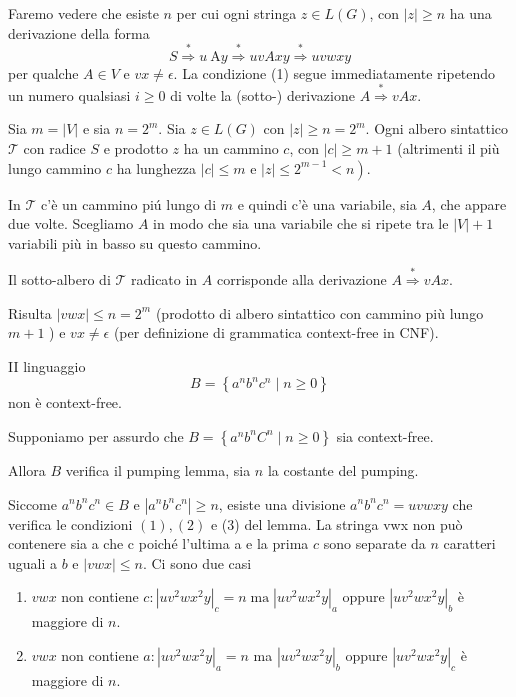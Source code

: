 Faremo vedere che esiste $n$ per cui ogni stringa $z \in L(G)$, con $|z| \geq n$ ha una derivazione della forma
$$
S \stackrel{*}{\Rightarrow} u \mathrm{~A} y \stackrel{*}{\Rightarrow} u v A x y \stackrel{*}{\Rightarrow} u v w x y
$$
per qualche $A \in V$ e $v x \neq \epsilon$.
La condizione (1) segue immediatamente ripetendo un numero qualsiasi $i 
\geq 0$ di volte la (sotto-) derivazione $A \stackrel{*}{\Rightarrow} v A x$.

\vspace{5mm}

Sia $m=|V|$ e sia $n=2^{m} .$ Sia $z \in L(G)$ con $|z| \geq n=2^{m} .$ Ogni albero sintattico $\mathcal{T}$ con radice $S$ e prodotto $z$ ha un cammino $c$, con $|c| \geq m+1$ (altrimenti il più lungo cammino $c$ ha lunghezza $|c| \leq m$ e $\left.|z| \leq 2^{m-1}<n\right)$.

In $\mathcal{T}$ c'è un cammino piú lungo di $m$ e quindi c'è una variabile, sia $A$, che appare due volte. Scegliamo $A$ in modo che sia una variabile che si ripete tra le $|V|+1$ variabili più in basso su questo cammino.

Il sotto-albero di $\mathcal{T}$ radicato in $A$ corrisponde alla derivazione $A \stackrel{*}{\Rightarrow} v A x$.

Risulta $|v w x| \leq n=2^{m}$ (prodotto di albero sintattico con cammino più lungo $m+1$ ) e $v x \neq \epsilon$ (per definizione di grammatica context-free in CNF).

\vspace{5mm}

II linguaggio
$$
B=\left\{a^{n} b^{n} c^{n} \mid n \geq 0\right\}
$$
non è context-free.

\vspace{5mm}

Supponiamo per assurdo che $B=\left\{a^{n} b^{n} C^{n} \mid n \geq 0\right\}$ sia context-free.

Allora $B$ verifica il pumping lemma, sia $n$ la costante del pumping.

Siccome $a^{n} b^{n} c^{n} \in B$ e $\left|a^{n} b^{n} c^{n}\right| \geq n$, esiste una divisione $a^{n} b^{n} c^{n}=u v w x y$ che verifica le condizioni $(1),(2)$ e (3) del lemma.
La stringa vwx non può contenere sia a che c poiché l'ultima a e la prima $c$ sono separate da $n$ caratteri uguali a $b$ e $|v w x| \leq n .$ Ci sono due casi
\begin{enumerate}
    \item $v w x$ non contiene $c:\left|u v^{2} w x^{2} y\right|_{c}=n \operatorname{ma}\left|u v^{2} w x^{2} y\right|_{a}$ oppure $\left|u v^{2} w x^{2} y\right|_{b}$ è maggiore di $n$.
    \item $v w x$ non contiene $a:\left|u v^{2} w x^{2} y\right|_{a}=n$ ma $\left|u v^{2} w x^{2} y\right|_{b}$ oppure $\left|u v^{2} w x^{2} y\right|_{c}$ è maggiore di $n$.
\end{enumerate}

